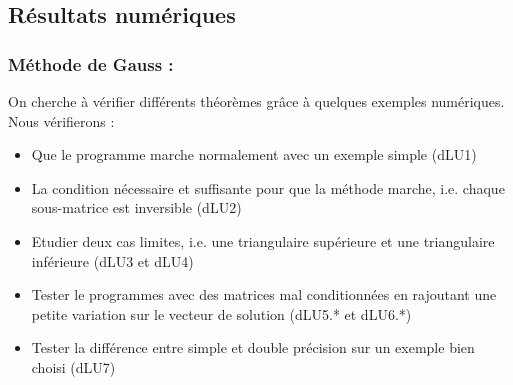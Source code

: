 \documentclass{article}
\theoremstyle{mes_theoremes}
\begin{document}
\newpage
\textcolor{or}{\part*{Résultats numériques}}
\textcolor{bleu}{\section*{Méthode de Gauss :}} 
On cherche à vérifier différents théorèmes grâce à quelques exemples numériques. Nous vérifierons : 
\begin{itemize}
\item Que le programme marche normalement avec un exemple simple (dLU1)
\item La condition nécessaire et suffisante pour que la méthode marche, i.e. chaque sous-matrice est inversible (dLU2)
\item Etudier deux cas limites, i.e. une triangulaire supérieure et une triangulaire inférieure (dLU3 et dLU4)
\item Tester le programmes avec des matrices mal conditionnées en rajoutant une petite variation sur le vecteur de solution (dLU5.* et dLU6.*)
\item Tester la différence entre simple et double précision sur un exemple bien choisi (dLU7)
\end{itemize}
\end{document}
